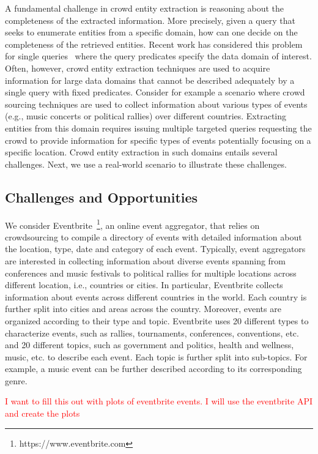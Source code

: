 \documentclass{sig-alternate}
\begin{document}
A fundamental challenge in crowd entity extraction is reasoning about the completeness of the extracted information. More precisely, given a query that seeks to enumerate entities from a specific domain, how can one decide on the completeness of the retrieved entities. Recent work has considered this problem for single queries~\cite{trushkowsky:2013} where the query predicates specify the data domain of interest. Often, however, crowd entity extraction techniques are used to acquire information for large data domains that cannot be described adequately by a single query with fixed predicates. Consider for example a scenario where crowd sourcing techniques are used to collect information about various types of events (e.g., music concerts or political rallies) over different countries. Extracting entities from this domain requires issuing multiple targeted queries requesting the crowd to provide information for specific types of events potentially focusing on a specific location. Crowd entity extraction in such domains entails several challenges. Next, we use a real-world scenario to illustrate these challenges.

\subsection{Challenges and Opportunities}
\label{sec:challenges}
We consider Eventbrite~\footnote{https://www.eventbrite.com}, an online event aggregator, that relies on crowdsourcing to compile a directory of events with detailed information about the location, type, date and category of each event. Typically, event aggregators are interested in collecting information about diverse events spanning from conferences and music festivals to political rallies for multiple locations across different location, i.e., countries or cities. In particular, Eventbrite collects information about events across different countries in the world. Each country is further split into cities and areas across the country. Moreover, events are organized according to their type and topic. Eventbrite uses 20 different types to characterize events, such as rallies, tournaments, conferences, conventions, etc. and 20 different topics, such as government and politics, health and wellness, music, etc.  to describe each event. Each topic is further split into sub-topics. For example, a  music event can be further described according to its corresponding genre. 

\textcolor{red}{I want to fill this out with plots of eventbrite events. I will use the eventbrite API and create the plots}
\end{document}
